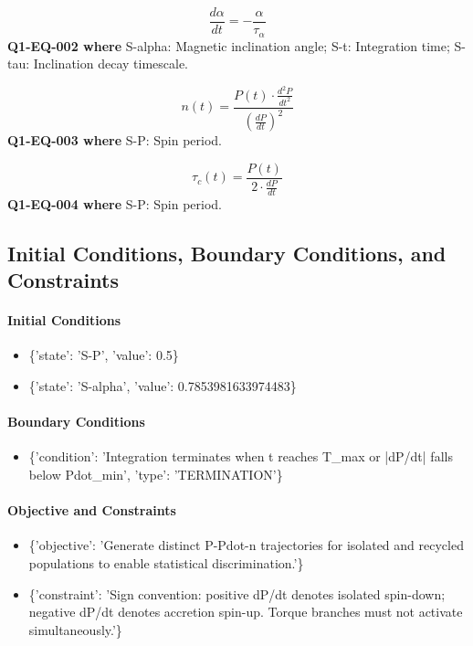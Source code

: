 \documentclass[11pt]{article}
\begin{document}
\begin{equation}\label{eq:Q1-EQ-002}
\frac{d\alpha}{dt} = -\frac{\alpha}{\tau_\alpha}
\end{equation}
\noindent\textbf{Q1-EQ-002 where} S-alpha: Magnetic inclination angle; S-t: Integration time; S-tau: Inclination decay timescale.

\begin{equation}\label{eq:Q1-EQ-003}
n(t) = \frac{P(t) \cdot \frac{d^2P}{dt^2}}{\left(\frac{dP}{dt}\right)^2}
\end{equation}
\noindent\textbf{Q1-EQ-003 where} S-P: Spin period.

\begin{equation}\label{eq:Q1-EQ-004}
\tau_c(t) = \frac{P(t)}{2 \cdot \frac{dP}{dt}}
\end{equation}
\noindent\textbf{Q1-EQ-004 where} S-P: Spin period.

\subsection{Initial Conditions, Boundary Conditions, and Constraints}

\paragraph{Initial Conditions}
\begin{itemize}\raggedright
\item \{'state': 'S-P', 'value': 0.5\}
\item \{'state': 'S-alpha', 'value': 0.7853981633974483\}
\end{itemize}

\paragraph{Boundary Conditions}
\begin{itemize}\raggedright
\item \{'condition': 'Integration terminates when t reaches T\_\allowbreak{}max or |dP/\allowbreak{}dt| falls below Pdot\_\allowbreak{}min', 'type': 'TERMINATION'\}
\end{itemize}

\paragraph{Objective and Constraints}
\begin{itemize}\raggedright
\item \{'objective': 'Generate distinct P-Pdot-n trajectories for isolated and recycled populations to enable statistical discrimination.'\}
\item \{'constraint': 'Sign convention: positive dP/\allowbreak{}dt denotes isolated spin-down; negative dP/\allowbreak{}dt denotes accretion spin-up. Torque branches must not activate simultaneously.'\}
\end{itemize}
\end{document}
